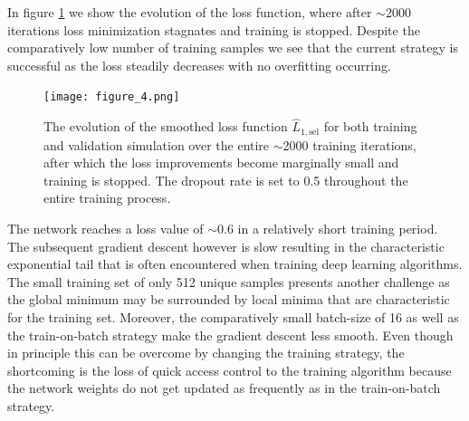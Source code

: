\documentclass[fleqn,usenatbib]{mnras}
\begin{document}
In figure \ref{fig:loss_evolution} we show the evolution of the loss function, where after $\sim$2000 iterations loss minimization stagnates and training is stopped. Despite the comparatively low number of training samples we see that the current strategy is successful as the loss steadily decreases with no overfitting occurring.
\begin{figure}
 \texttt{[image: figure\_4.png]}
 \caption{The evolution of the smoothed loss function $\hat{L}_{1,\text{sel}}$ for both training and validation simulation over the entire $\sim$2000 training iterations, after which the loss improvements become marginally small and training is stopped. The dropout rate is set to 0.5 throughout the entire training process.}
 \label{fig:loss_evolution}
\end{figure}
The network reaches a loss value of $\sim$0.6 in a relatively short training period. The subsequent gradient descent however is slow resulting in the characteristic exponential tail that is often encountered when training deep learning algorithms. The small training set of only 512 unique samples presents another challenge as the global minimum may be surrounded by local minima that are characteristic for the training set. Moreover, the comparatively small batch-size of 16 as well as the train-on-batch strategy make the gradient descent less smooth. Even though in principle this can be overcome by changing the training strategy, the shortcoming is the loss of quick access control to the training algorithm because the network weights do not get updated as frequently as in the train-on-batch strategy.\\
\end{document}
